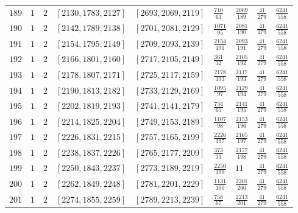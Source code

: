 \documentclass[12pt]{extarticle}
\begin{document}
\begin{longtable}{lllllllll}
$189$ & $1$ & $2$ & $\left[2130, 1783, 2127\right]$ & $\left[2693, 2069, 2119\right]$ & $\frac{710}{63}$ & $\frac{2069}{189}$ & $\frac{41}{279}$ & $\frac{6241}{558}$ \\
$190$ & $1$ & $2$ & $\left[2142, 1789, 2138\right]$ & $\left[2701, 2081, 2129\right]$ & $\frac{1071}{95}$ & $\frac{2081}{190}$ & $\frac{41}{279}$ & $\frac{6241}{558}$ \\
$191$ & $1$ & $2$ & $\left[2154, 1795, 2149\right]$ & $\left[2709, 2093, 2139\right]$ & $\frac{2154}{191}$ & $\frac{2093}{191}$ & $\frac{41}{279}$ & $\frac{6241}{558}$ \\
$192$ & $1$ & $2$ & $\left[2166, 1801, 2160\right]$ & $\left[2717, 2105, 2149\right]$ & $\frac{361}{32}$ & $\frac{2105}{192}$ & $\frac{41}{279}$ & $\frac{6241}{558}$ \\
$193$ & $1$ & $2$ & $\left[2178, 1807, 2171\right]$ & $\left[2725, 2117, 2159\right]$ & $\frac{2178}{193}$ & $\frac{2117}{193}$ & $\frac{41}{279}$ & $\frac{6241}{558}$ \\
$194$ & $1$ & $2$ & $\left[2190, 1813, 2182\right]$ & $\left[2733, 2129, 2169\right]$ & $\frac{1095}{97}$ & $\frac{2129}{194}$ & $\frac{41}{279}$ & $\frac{6241}{558}$ \\
$195$ & $1$ & $2$ & $\left[2202, 1819, 2193\right]$ & $\left[2741, 2141, 2179\right]$ & $\frac{734}{65}$ & $\frac{2141}{195}$ & $\frac{41}{279}$ & $\frac{6241}{558}$ \\
$196$ & $1$ & $2$ & $\left[2214, 1825, 2204\right]$ & $\left[2749, 2153, 2189\right]$ & $\frac{1107}{98}$ & $\frac{2153}{196}$ & $\frac{41}{279}$ & $\frac{6241}{558}$ \\
$197$ & $1$ & $2$ & $\left[2226, 1831, 2215\right]$ & $\left[2757, 2165, 2199\right]$ & $\frac{2226}{197}$ & $\frac{2165}{197}$ & $\frac{41}{279}$ & $\frac{6241}{558}$ \\
$198$ & $1$ & $2$ & $\left[2238, 1837, 2226\right]$ & $\left[2765, 2177, 2209\right]$ & $\frac{373}{33}$ & $\frac{2177}{198}$ & $\frac{41}{279}$ & $\frac{6241}{558}$ \\
$199$ & $1$ & $2$ & $\left[2250, 1843, 2237\right]$ & $\left[2773, 2189, 2219\right]$ & $\frac{2250}{199}$ & $11$ & $\frac{41}{279}$ & $\frac{6241}{558}$ \\
$200$ & $1$ & $2$ & $\left[2262, 1849, 2248\right]$ & $\left[2781, 2201, 2229\right]$ & $\frac{1131}{100}$ & $\frac{2201}{200}$ & $\frac{41}{279}$ & $\frac{6241}{558}$ \\
$201$ & $1$ & $2$ & $\left[2274, 1855, 2259\right]$ & $\left[2789, 2213, 2239\right]$ & $\frac{758}{67}$ & $\frac{2213}{201}$ & $\frac{41}{279}$ & $\frac{6241}{558}$ \\

\end{longtable}
\end{document}
